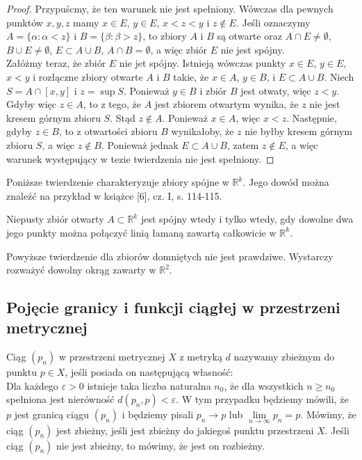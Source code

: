 \documentclass[leqno]{article}
\begin{document}
\begin{justify}
\begin{proof}
    Przypuścmy, że ten warunek nie jest spełniony. Wówczas dla pewnych punktów
    $x, y, z$ mamy $x \in E$, $y \in E$, $x < z < y$ i $z \notin E$.
    Jeśli oznaczymy $A = \{\alpha : \alpha < z\}$ i $B = \{\beta : \beta > z\}$, to zbiory $A$ i $B$ są otwarte
    oraz $A \cap E \neq \emptyset$, $B \cup E \neq \emptyset$, $E \subset A \cup B$, $A \cap B = \emptyset$, a więc zbiór $E$ nie jest spójny. \\
    Załóżmy teraz, że zbiór $E$ nie jet spójny. Istnieją wówczas punkty $x \in E$, $y \in E$, $x < y$ i rozłączne zbiory otwarte $A$ i $B$ takie, że
    $x \in A$, $y \in B$, i $E \subset A \cup B$. Niech $S = A \cap [x, y]$ i $z = \sup S$.
    Ponieważ $y \in B$ i zbiór $B$ jest otwaty, więc $z < y$. Gdyby więc $z \in A$, to z tego, że $A$ jest zbiorem otwartym
    wynika, że $z$ nie jest kresem górnym zbioru $S$. Stąd $z \notin A$. Ponieważ $x \in A$, więc $x < z$.
    Następnie, gdyby $z \in B$, to z otwartości zbioru $B$ wynikałoby, że $z$ nie byłby kresem górnym zbioru $S$, a więc $z \notin B$.
    Ponieważ jednak $E \subset A \cup B$, zatem $z \notin E$, a więc warunek występujący w tezie twierdzenia nie jest spełniony.
\end{proof}

Poniższe twierdzenie charakteryzuje zbiory spójne w $\mathbb{R}^k$. Jego dowód można znaleźć na przykład w książce [6], cz. I, s. 114-115.

\begin{theorem}
{
    Niepusty zbiór otwarty $A \subset \mathbb{R}^k$ jest spójny wtedy i tylko wtedy, gdy dowolne dwa jego punkty można połączyć linią łamaną zawartą całkowicie w $\mathbb{R}^k$.
}
\end{theorem}

Powyższe twierdzenie dla zbiorów domniętych nie jest prawdziwe. Wystarczy rozważyć dowolny okrąg zawarty w $\mathbb{R}^2$.

\subsection{Pojęcie granicy i funkcji ciągłej w przestrzeni metrycznej}

\begin{defn}
    Ciąg $(p_n)$ w przestrzeni metrycznej $X$ z metryką $d$ nazywamy zbieżnym do punktu $p \in X$, jeśli posiada on następującą własność: \\
    Dla każdego $\varepsilon > 0$ istnieje taka liczba naturalna $n_0$, że dla wszystkich $n \geqslant n_0$ spełniona jest nierówność $d(p_n, p) < \varepsilon$.
    W tym przypadku będziemy mówili, że $p$ jest granicą ciągu $(p_n)$ i będziemy pisali $p_n \to p$ lub 
    $\lim\limits_{n \to \infty} p_n = p$. Mówimy, że ciąg $(p_n)$ jest zbieżny, jeśli jest zbieżny do jakiegoś punktu przestrzeni $X$.
    Jeśli ciąg $(p_n)$ nie jest zbieżny, to mówimy, że jest on rozbieżny. 
\end{defn}


\end{justify}
\end{document}
